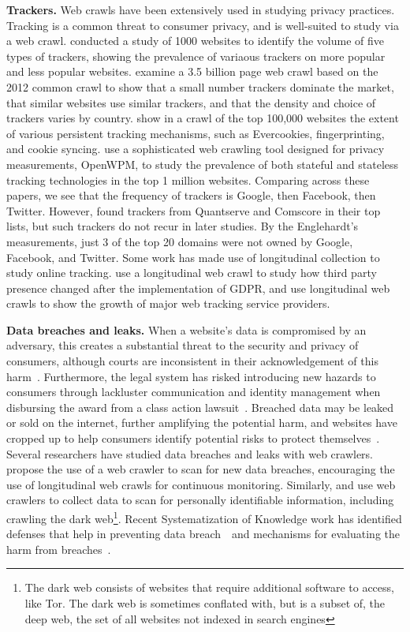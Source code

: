 \textbf{Trackers.}
Web crawls have been extensively used in studying privacy practices. Tracking is a common threat to consumer privacy, and is well-suited to study via a web crawl. \citet{roesner2012detecting} conducted a study of 1000 websites to identify the volume of five types of trackers, showing the prevalence of variaous trackers on more popular and less popular websites. \citet{schelter2018ubiquity} examine a 3.5 billion page web crawl based on the 2012 common crawl to show that a small number trackers dominate the market, that similar websites use similar trackers, and that the density and choice of trackers varies by country. \citet{acar2014web} show in a crawl of the top 100,000 websites the extent of various persistent tracking mechanisms, such as Evercookies, fingerprinting, and cookie syncing. \citet{englehardt2016online} use a sophisticated web crawling tool designed for privacy measurements, OpenWPM, to study the prevalence of both stateful and stateless tracking technologies in the top 1 million websites. Comparing across these papers, we see that the frequency of trackers is Google, then Facebook, then Twitter. However, \citet{roesner2012detecting} found trackers from Quantserve and Comscore in their top lists, but such trackers do not recur in later studies. By the Englehardt's measurements, just 3 of the top 20 domains were not owned by Google, Facebook, and Twitter. Some work has made use of longitudinal collection to study online tracking. \citet{sorensen2019before} use a longitudinal web crawl to study how third party presence changed after the implementation of GDPR, and \citet{krishnamurthy2009privacy} use longitudinal web crawls to show the growth of major web tracking service providers.

\textbf{Data breaches and leaks.}
When a website's data is compromised by an adversary, this creates a substantial threat to the security and privacy of consumers, although courts are inconsistent in their acknowledgement of this harm~\cite{solove2017risk}. Furthermore, the legal system has risked introducing new hazards to consumers through lackluster communication and identity management when disbursing the award from a class action lawsuit~\cite{amos2019enhancing}. Breached data may be leaked or sold on the internet, further amplifying the potential harm, and websites have cropped up to help consumers identify potential risks to protect themselves~\cite{hunt2019have}. Several researchers have studied data breaches and leaks with web crawlers. \citet{trabelsi2019monitoring} propose the use of a web crawler to scan for new data breaches, encouraging the use of longitudinal web crawls for continuous monitoring. Similarly, \citet{liu2020identifying} and \cite{nazah2021unsupervised} use web crawlers to collect data to scan for personally identifiable information, including crawling the dark web\footnote{The dark web consists of websites that require additional software to access, like Tor. The dark web is sometimes conflated with, but is a subset of, the deep web, the set of all websites not indexed in search engines}. Recent Systematization of Knowledge work has identified defenses that help in preventing data breach~\cite{saleem2020sok,saleem2020sok}~and mechanisms for evaluating the harm from breaches~\cite{saleem2020sok}.

